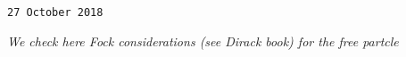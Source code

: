 

\baselineskip=14pt
\def\vare {\varepsilon}
\def\A {{\bf A}}
\def\t {\tilde}
\def\a {\alpha}
\def\K {{\bf K}}
\def\N {{\bf N}}
\def\V {{\cal V}}
\def\s {{\sigma}}
\def\S {{\Sigma}}
\def\s {{\sigma}}
\def\p{\partial}
\def\vare{{\varepsilon}}
\def\Q {{\bf Q}}
\def\D {{\cal D}}
\def\G {{\Gamma}}
\def\C {{\bf C}}
\def\M {{\cal M}}
\def\Z {{\bf Z}}
\def\U  {{\cal U}}
\def\H {{\cal H}}
\def\R  {{\bf R}}
\def\S  {{\bf S}}
\def\E  {{\bf E}}
\def\l {\lambda}
\def\ll {{\bf l}}
\def\degree {{\bf {\rm degree}\,\,}}
\def \finish {${\,\,\vrule height1mm depth2mm width 8pt}$}
\def \m {\medskip}
\def\p {\partial}
\def\r {{\bf r}}
\def\pt {{\bf p}}
\def\v {{\bf v}}
\def\n {{\bf n}}
\def\t {{\bf t}}
\def\b {{\bf b}}
\def\c {{\bf c }}
\def\e{{\bf e}}
\def\ac {{\bf a}}
\def \X   {{\bf X}}
\def \Y   {{\bf Y}}
\def \x   {{\bf x}}
\def \y   {{\bf y}}
\def \G{{\cal G}}
\def\w {{\omega}}
\def \Tr  {{\rm Tr\,}}
\def\V {{\cal V}}

{\tt 27 October 2018}


{\it We check here Fock considerations 
(see Dirack book) for the free partcle}


